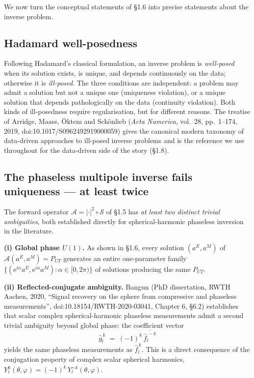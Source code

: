 \documentclass[
  english,
  11pt,
]{report}
\begin{document}
We now turn the conceptual statements of §1.6 into precise statements
about the inverse problem.

\subsection{Hadamard well-posedness}\label{hadamard-well-posedness}

Following Hadamard's classical formulation, an inverse problem is
\emph{well-posed} when its solution exists, is unique, and depends
continuously on the data; otherwise it is \emph{ill-posed}. The three
conditions are independent: a problem may admit a solution but not a
unique one (uniqueness violation), or a unique solution that depends
pathologically on the data (continuity violation). Both kinds of
ill-posedness require regularisation, but for different reasons. The
treatise of Arridge, Maass, Öktem and Schönlieb (\emph{Acta Numerica},
vol.~28, pp.~1--174, 2019, doi:10.1017/S0962492919000059) gives the
canonical modern taxonomy of data-driven approaches to ill-posed inverse
problems and is the reference we use throughout for the data-driven side
of the story (§1.8).

\subsection{The phaseless multipole inverse fails uniqueness --- at
least
twice}\label{the-phaseless-multipole-inverse-fails-uniqueness-at-least-twice}

The forward operator \(\mathcal{A} = |\cdot|^2 \circ \mathcal{S}\) of
§1.5 has \emph{at least two distinct trivial ambiguities}, both
established directly for spherical-harmonic phaseless inversion in the
literature.

\textbf{(i) Global phase \(U(1)\).} As shown in §1.6, every solution
\((a^E, a^M)\) of \(\mathcal{A}(a^E, a^M) = P_{UT}\) generates an entire
one-parameter family
\(\{(\mathrm{e}^{i\alpha}a^E, \mathrm{e}^{i\alpha}a^M) : \alpha\in[0,2\pi)\}\)
of solutions producing the same \(P_{UT}\).

\textbf{(ii) Reflected-conjugate ambiguity.} Bangun (PhD dissertation,
RWTH Aachen, 2020, ``Signal recovery on the sphere from compressive and
phaseless measurements'', doi:10.18154/RWTH-2020-03041, Chapter 6, §6.2)
establishes that scalar complex spherical-harmonic phaseless
measurements admit a second trivial ambiguity beyond global phase: the
coefficient vector \[
\hat g_l^{\,k} \;=\; (-1)^k\,\overline{\hat f_l^{\,-k}}
\] yields the same phaseless measurements as \(\hat f_l^{\,k}\). This is
a direct consequence of the conjugation property of complex scalar
spherical harmonics,
\(Y_l^{k}(\theta,\varphi) = (-1)^k\,\overline{Y_l^{-k}(\theta,\varphi)}\).
\end{document}
